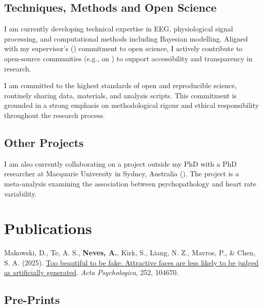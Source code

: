 \documentclass[11pt,a4paper,]{awesome-cv}
\begin{document}
\normalsize

\small

\subsection{Techniques, Methods and Open
Science}\label{techniques-methods-and-open-science}

I am currently developing technical expertise in EEG, physiological
signal processing, and computational methods including Bayesian
modelling. Aligned with my supervisor's
(\href{https://github.com/DominiqueMakowski}{})
commitment to open science, I actively contribute to open-source
communities (e.g., on
\href{https://github.com/AnafNeves}{})
to support accessibility and transparency in research.

I am committed to the highest standards of open and reproducible
science, routinely sharing data, materials, and analysis scripts. This
commitment is grounded in a strong emphasis on methodological rigour and
ethical responsibility throughout the research process.

\subsection{Other Projects}\label{other-projects}

I am also currently collaborating on a project outside my PhD with a PhD
researcher at Macquarie University in Sydney, Australia
(\href{https://github.com/Tam-Pham}{}).
The project is a meta-analysis examining the association between
psychopathology and heart rate variability.

\section{Publications}\label{publications}

Makowski, D., Te, A. S., \textbf{Neves, A.}, Kirk, S., Liang, N. Z.,
Mavros, P., \& Chen, S. A. (2025).
\href{https://doi.org/10.1016/j.actpsy.2024.104670}{Too beautiful to be
fake: Attractive faces are less likely to be judged as artificially
generated}. \emph{Acta Psychologica}, 252, 104670.

\subsection{Pre-Prints}\label{pre-prints}
\end{document}
